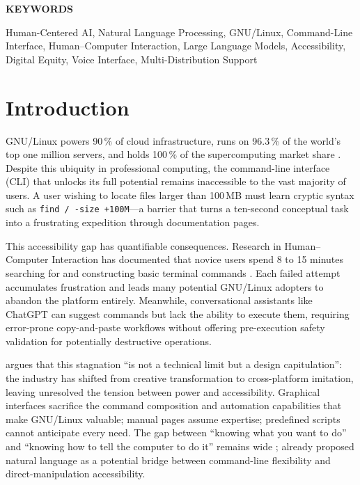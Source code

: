 \documentclass[10pt,a4paper]{article}
\begin{document}
{
\vspace{18pt}
\noindent\fontsize{9}{10.8}\bfseries KEYWORDS\par
\vspace{6pt}
\fontsize{10}{12}\selectfont
\noindent
Human-Centered AI, Natural Language Processing, GNU/Linux, Command-Line Interface, Human--Computer Interaction, Large Language Models, Accessibility, Digital Equity, Voice Interface, Multi-Distribution Support\par
}

\vspace{12pt}

\section{Introduction}
\label{sec:introduction}

GNU/Linux powers 90\,\% of cloud infrastructure, runs on 96.3\,\% of the world's top one million servers, and holds 100\,\% of the supercomputing market share \citep{W3Techs2023, Top5002023}. Despite this ubiquity in professional computing, the command-line interface (CLI) that unlocks its full potential remains inaccessible to the vast majority of users. A user wishing to locate files larger than 100\,MB must learn cryptic syntax such as \texttt{find / -size +100M}---a barrier that turns a ten-second conceptual task into a frustrating expedition through documentation pages.

This accessibility gap has quantifiable consequences. Research in Human--Computer Interaction has documented that novice users spend 8 to 15 minutes searching for and constructing basic terminal commands \citep{Norman1988, Norman2013}. Each failed attempt accumulates frustration and leads many potential GNU/Linux adopters to abandon the platform entirely. Meanwhile, conversational assistants like ChatGPT can suggest commands but lack the ability to execute them, requiring error-prone copy-and-paste workflows without offering pre-execution safety validation for potentially destructive operations.

\citet{Jenson2024} argues that this stagnation ``is not a technical limit but a design capitulation'': the industry has shifted from creative transformation to cross-platform imitation, leaving unresolved the tension between power and accessibility. Graphical interfaces sacrifice the command composition and automation capabilities that make GNU/Linux valuable; manual pages assume expertise; predefined scripts cannot anticipate every need. The gap between ``knowing what you want to do'' and ``knowing how to tell the computer to do it'' remains wide \citep{Myers2004}; already \citet{ShneidermanPlaisant2010} proposed natural language as a potential bridge between command-line flexibility and direct-manipulation accessibility.
\end{document}
